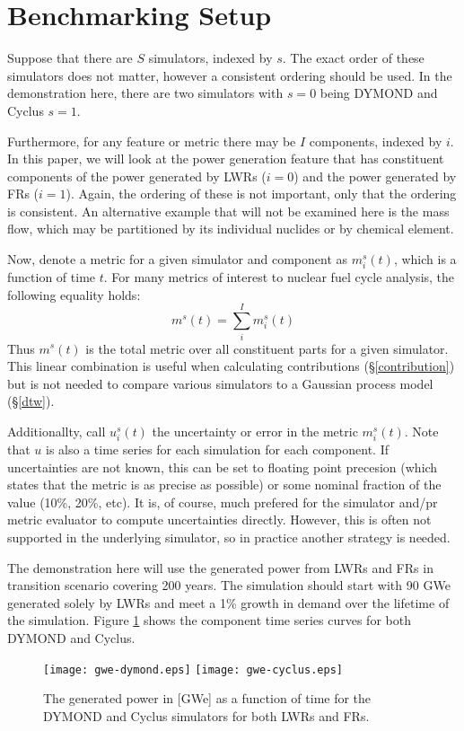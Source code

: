 \section{Benchmarking Setup}
\label{setup}

Suppose that there are $S$ simulators, indexed by $s$. The exact order 
of these simulators does not matter, however a consistent ordering should
be used. In the demonstration here, there are two simulators with $s=0$
being DYMOND and Cyclus $s=1$.

Furthermore, for any feature or metric there may be $I$ components, 
indexed by $i$. In this paper, we will look at the power generation feature
that has constituent components of the power generated by LWRs ($i=0$) and
the power generated by FRs ($i=1$).  Again, the ordering of these is not 
important, only that the ordering is consistent. An alternative example
that will not be examined here is the mass flow, which may be partitioned 
by its individual nuclides or by chemical element.

Now, denote a metric for a given simulator and component as 
$m_i^s(t)$, which is a function of time $t$. For many metrics of interest 
to nuclear fuel cycle analysis, the following equality holds:
\begin{equation}
m^s(t) = \sum_i^I m_i^s(t)
\end{equation}
Thus $m^s(t)$ is the total metric over all constituent parts for a given 
simulator. This linear combination is useful when calculating contributions
(\S \ref{contribution}) but is not needed to compare various simulators
to a Gaussian process model (\S \ref{dtw}).

Additionallty, call $u_i^s(t)$ the uncertainty or error in the metric 
$m_i^s(t)$. Note that $u$ is also a time series for each simulation for 
each component. If uncertainties are not known, this can be set to floating
point precesion (which states that the metric is as precise as possible) or
some nominal fraction of the value (10\%, 20\%, etc). It is, of course, 
much prefered for the simulator and/pr metric evaluator to compute 
uncertainties directly. However, this is often not supported in the underlying
simulator, so in practice another strategy is needed.  

The demonstration here will use the generated power from LWRs and FRs in 
transition scenario covering 200 years. The simulation should start with
90 GWe generated solely by LWRs and meet a 1\% growth in demand over the 
lifetime of the simulation. Figure \ref{gwe-simulators} shows the component time 
series curves for both DYMOND and Cyclus.

\begin{figure}[htb]
\centering
\texttt{[image: gwe-dymond.eps]}
\texttt{[image: gwe-cyclus.eps]}
\caption{The generated power in [GWe] as a function of time for the DYMOND and 
Cyclus simulators for both LWRs and FRs.}
\label{gwe-simulators}
\end{figure}

\clearpage